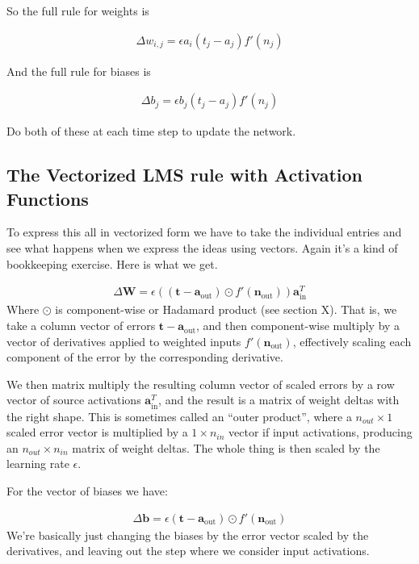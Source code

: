 So the full rule for weights is

\begin{eqnarray*}
\Delta w_{i,j}  =  \epsilon a_i (t_j - a_j) f' (n_j)
\end{eqnarray*}

And the full rule for biases is 

\begin{eqnarray*}
\Delta b_{j}  =  \epsilon b_j (t_j - a_j) f' (n_j)
\end{eqnarray*}

Do both of these at each time step to update the network.

\subsection{The Vectorized LMS rule with Activation Functions}

To express this all in vectorized form we have to take the individual entries and see what happens when we express the ideas using vectors.  Again it's a kind of bookkeeping exercise. Here is what we get.

\begin{eqnarray*}
\Delta \mathbf{W}  =  \epsilon ((\mathbf{t} - \mathbf{a}_{\text{out}}) \odot f'( \mathbf{n}_{\text{out}})) \mathbf{a}_{\text{in}}^T
\end{eqnarray*}
Where $\odot$ is component-wise or Hadamard product (see section X). That is, we take a column vector of errors $\mathbf{t} - \mathbf{a}_{\text{out}}$, and then component-wise multiply by a vector of derivatives applied to weighted inputs $f'( \mathbf{n}_{\text{out}})$, effectively scaling each component of the error by the corresponding derivative. 

We then matrix multiply the resulting column vector of scaled errors by a row vector of source activations $ \mathbf{a}_{\text{in}}^T$, and the result is a matrix of weight deltas with the right shape. This is sometimes called an ``outer product'', where a $n_{out} \times 1$ scaled error vector is multiplied by a  $1 \times n_{in}$ vector if input activations, producing an $n_{out} \times n_{in}$ matrix of weight deltas. The whole thing is then scaled by the learning rate $\epsilon$.

For the vector of biases we have:

\begin{eqnarray*}
\Delta \mathbf{b}  =  \epsilon (\mathbf{t} - \mathbf{a}_{\text{out}}) \odot f'( \mathbf{n}_{\text{out}})
\end{eqnarray*}
We're basically just changing the biases by the error vector scaled by the derivatives, and leaving out the step where we consider input activations.

